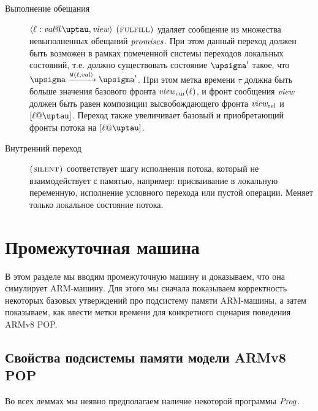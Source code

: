 \begin{description}
  \item[Выполнение обещания] $\writeEvt{\loc}{\stval}{\tau}{\R}$ $\textsc{(fulfill)}$ удаляет сообщение из множества
    невыполненных обещаний $\mathit{promises}$. При этом данный переход должен быть возможен в
    рамках помеченной системы переходов локальных состояний, т.е. должно существовать
    состояние $\pstate'$ такое, что $\pstate \xrightarrow{\wlab{}{\loc}{\stval}} \pstate'$.
    При этом метка времени $\tau$ должна быть больше значения базового фронта $\mathit{view}_{\mathrm{cur}}(\ell)$,
    и фронт сообщения $\mathit{view}$ должен быть равен композиции высвобождающего фронта $\mathit{view}_{\mathrm{rel}}$
    и $[\loc@\tau]$. Переход также увеличивает базовый и приобретающий фронты потока на $[\loc@\tau]$.

  \item[Внутренний переход] $\textsc{(silent)}$ соответствует шагу исполнения потока, который не взаимодействует
    с памятью, например: присваивание в локальную переменную, исполнение условного перехода или пустой операции.
    Меняет только локальное состояние потока.
\end{description}

\section{Промежуточная машина \ARMt}
В этом разделе мы вводим промежуточную машину \ARMt и доказываем, что она симулирует
ARM-машину.
Для этого мы сначала показываем корректность некоторых базовых утверждений
про подсистему памяти ARM-машины,
а затем показываем, как ввести метки времени для конкретного сценария поведения ARMv8 POP.

\subsection{Свойства подсистемы памяти модели ARMv8 POP}
Во всех леммах мы неявно предполагаем наличие некоторой программы $\mathit{Prog}$.

